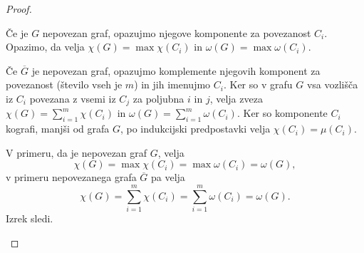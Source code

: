 \documentclass[12pt,a4paper,twoside]{article}
\theoremstyle{definition} %
\theoremstyle{plain} %
\numberwithin{equation}{section}  %
\begin{document}
\begin{proof}
\begin{itemize}
Če je $G$ nepovezan graf, opazujmo njegove komponente za povezanost $C_i$. Opazimo, da velja $\chi(G) = \max \chi(C_i)$ in $\omega(G) = \max\omega(C_i)$.

Če $\overline{G}$ je nepovezan graf, opazujmo komplemente njegovih komponent za povezanost (število vseh je $m$) in jih imenujmo $C_i$. Ker so v grafu $G$ vsa vozlišča iz $C_i$ povezana z vsemi iz $C_j$ za poljubna $i$ in $j$, velja zveza $\chi(G) = \sum_{i=1}^m\chi(C_i)$ in $\omega(G) = \sum_{i=1}^m\omega(C_i)$. Ker so komponente $C_i$ kografi, manjši od grafa $G$, po indukcijski predpostavki velja $\chi(C_i) = \mu(C_i)$. 

V primeru, da je nepovezan graf $G$, velja  $$\chi(G) = \max \chi(C_i) =  \max \omega(C_i) = \omega(G),$$
v primeru nepovezanega grafa $\overline{G}$ pa velja $$\chi(G) = \sum_{i=1}^m \chi(C_i) =  \sum_{i=1}^m \omega(C_i) = \omega(G).$$ Izrek sledi. \qedhere
\end{itemize}
\end{proof}
\end{document}
